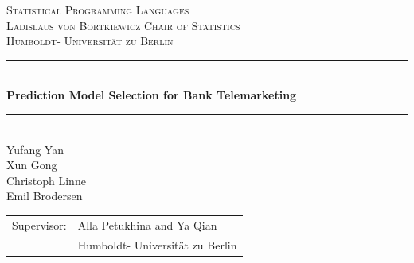 \begin{titlepage}
\thispagestyle{fancy}
\fancyhf{}
\centering
\textsc{\Large{Statistical Programming Languages} \\ \vspace{6mm}
\large{Ladislaus von Bortkiewicz Chair of Statistics} \\ \vspace{6mm} \large{Humboldt- Universit\"at zu Berlin}}

\vspace*{.3cm}
\rule{\textwidth}{1pt}\\[0.4cm]
{\huge \bfseries
     Prediction Model Selection for Bank Telemarketing %
     \\[0.8\baselineskip]
     }
\rule{\textwidth}{1pt}\\[0.4cm]
\vspace{3cm}
\large{Yufang Yan\\Xun Gong\\Christoph Linne\\Emil Brodersen}
\vspace*{2cm}
\begin{table}[b]
\begin{flushleft}
\begin{tabular}{ll}
Supervisor:&Alla Petukhina and Ya Qian\\
    & Humboldt- Universit\"at zu Berlin \\
\end{tabular}
\end{flushleft}
\end{table}


\end{titlepage}
\pagestyle{empty} %


    \newpage
    \pagestyle{fancy}
